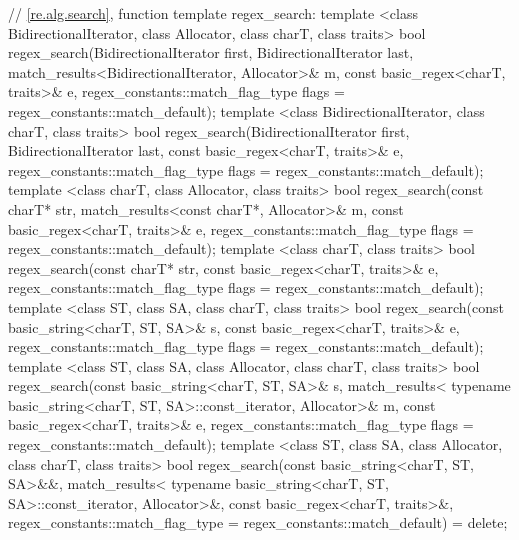 \begin{codeblock}
{  // \ref{re.alg.search}, function template regex_search:
  template <class BidirectionalIterator, class Allocator,
      class charT, class traits>
    bool regex_search(BidirectionalIterator first, BidirectionalIterator last,
                      match_results<BidirectionalIterator, Allocator>& m,
                      const basic_regex<charT, traits>& e,
                      regex_constants::match_flag_type flags =
                        regex_constants::match_default);
  template <class BidirectionalIterator, class charT, class traits>
    bool regex_search(BidirectionalIterator first, BidirectionalIterator last,
                      const basic_regex<charT, traits>& e,
                      regex_constants::match_flag_type flags =
                        regex_constants::match_default);
  template <class charT, class Allocator, class traits>
    bool regex_search(const charT* str,
                      match_results<const charT*, Allocator>& m,
                      const basic_regex<charT, traits>& e,
                      regex_constants::match_flag_type flags =
                        regex_constants::match_default);
  template <class charT, class traits>
    bool regex_search(const charT* str,
                      const basic_regex<charT, traits>& e,
                      regex_constants::match_flag_type flags =
                        regex_constants::match_default);
  template <class ST, class SA, class charT, class traits>
    bool regex_search(const basic_string<charT, ST, SA>& s,
                      const basic_regex<charT, traits>& e,
                      regex_constants::match_flag_type flags =
                        regex_constants::match_default);
  template <class ST, class SA, class Allocator, class charT, class traits>
    bool regex_search(const basic_string<charT, ST, SA>& s,
                      match_results<
                        typename basic_string<charT, ST, SA>::const_iterator, 
                        Allocator>& m,
                      const basic_regex<charT, traits>& e,
                      regex_constants::match_flag_type flags =
                        regex_constants::match_default);
  template <class ST, class SA, class Allocator, class charT, class traits> 
    bool regex_search(const basic_string<charT, ST, SA>&&, 
                      match_results<
                        typename basic_string<charT, ST, SA>::const_iterator, 
                        Allocator>&, 
                      const basic_regex<charT, traits>&, 
                      regex_constants::match_flag_type = 
                        regex_constants::match_default) = delete;

}
\end{codeblock}

